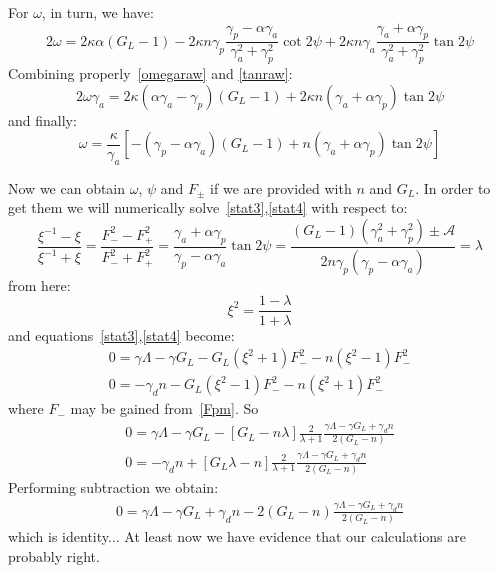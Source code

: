 \documentclass[12pt, notitlepage]{report}
\begin{document}
For $\omega$, in turn, we have:
\begin{equation}
	\label{omegaraw}
	2\omega = 2\kappa \alpha \left(G_L - 1\right) -  2\kappa n\gamma_p  \frac{\gamma_p - \alpha\gamma_a}{\gamma_a^2 + \gamma_p^2}\cot 2\psi +   2\kappa n \gamma_a\frac{\gamma_a + \alpha\gamma_p}{\gamma_a^2 + \gamma_p^2}\tan 2\psi
\end{equation}
Combining properly~\eqref{omegaraw} and \eqref{tanraw}:
\begin{equation}
	2\omega\gamma_a = 2\kappa \left(\alpha \gamma_a - \gamma_p\right)\left(G_L - 1\right) +   2\kappa n \left(\gamma_a + \alpha\gamma_p\right)\tan 2\psi
\end{equation}
and finally:
\begin{equation}
	\omega = \frac{\kappa}{\gamma_a} \left[-\left(\gamma_p - \alpha \gamma_a\right)\left(G_L - 1\right) +   n \left(\gamma_a + \alpha\gamma_p\right)\tan 2\psi\right]
\end{equation}

Now we can obtain $\omega$, $\psi$ and $F_\pm$ if we are provided with $n$ and $G_L$. In order to get them we will numerically solve~\eqref{stat3},\eqref{stat4} with respect to:
\begin{equation}
	\frac{\xi^{-1}-\xi}{\xi^{-1}+\xi} = \frac{F_-^2-F_+^2}{F_-^2 + F_+^2} = \frac{\gamma_a + \alpha\gamma_p}{\gamma_p - \alpha\gamma_a}\tan 2\psi = \frac{(G_L-1)(\gamma_a^2 + \gamma_p^2) \pm \mathcal{A}}{2n\gamma_p(\gamma_p - \alpha\gamma_a)} = \lambda
\end{equation}
from here:
\begin{equation}
	\xi^2 = \frac{1-\lambda}{1+\lambda}
\end{equation}
and equations~\eqref{stat3},\eqref{stat4} become:
\begin{gather}
	0 = \gamma\Lambda - \gamma G_L - G_L(\xi^2+1)F_-^2 - n(\xi^2 - 1)F_-^2 \\
	0 = -\gamma_d n - G_L(\xi^2-1)F_-^2 - n(\xi^2+1)F_-^2
\end{gather}
where $F_-$ may be gained from~\eqref{Fpm}. So
\begin{gather}
	0 = \gamma\Lambda - \gamma G_L - \left[G_L - n\lambda\right]\frac{2}{\lambda+1}\frac{\gamma \Lambda - \gamma G_L + \gamma_d n}{2(G_L - n)} \\
	0 = -\gamma_d n + \left[G_L\lambda - n\right]\frac{2}{\lambda+1}\frac{\gamma \Lambda - \gamma G_L + \gamma_d n}{2(G_L - n)}
\end{gather}
Performing subtraction we obtain:
\begin{gather}
	0 = \gamma\Lambda - \gamma G_L + \gamma_d n - 2(G_L - n)\frac{\gamma \Lambda - \gamma G_L + \gamma_d n}{2(G_L - n)}
\end{gather}
which is identity... At least now we have evidence that our calculations are probably right. 
\end{document}
